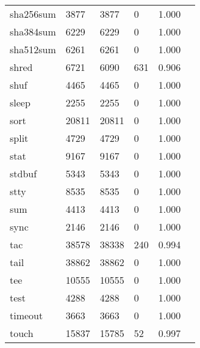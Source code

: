 \begin{longtable}{lp{2.40cm}p{2.40cm}p{2.40cm}p{2.40cm}p{2.40cm}}
sha256sum &                     3877 &         3877 &             0 &                    1.000 \\
sha384sum &                     6229 &         6229 &             0 &                    1.000 \\
sha512sum &                     6261 &         6261 &             0 &                    1.000 \\
shred     &                     6721 &         6090 &           631 &                    0.906 \\
shuf      &                     4465 &         4465 &             0 &                    1.000 \\
sleep     &                     2255 &         2255 &             0 &                    1.000 \\
sort      &                    20811 &        20811 &             0 &                    1.000 \\
split     &                     4729 &         4729 &             0 &                    1.000 \\
stat      &                     9167 &         9167 &             0 &                    1.000 \\
stdbuf    &                     5343 &         5343 &             0 &                    1.000 \\
stty      &                     8535 &         8535 &             0 &                    1.000 \\
sum       &                     4413 &         4413 &             0 &                    1.000 \\
sync      &                     2146 &         2146 &             0 &                    1.000 \\
tac       &                    38578 &        38338 &           240 &                    0.994 \\
tail      &                    38862 &        38862 &             0 &                    1.000 \\
tee       &                    10555 &        10555 &             0 &                    1.000 \\
test      &                     4288 &         4288 &             0 &                    1.000 \\
timeout   &                     3663 &         3663 &             0 &                    1.000 \\
touch     &                    15837 &        15785 &            52 &                    0.997 \\

\end{longtable}
